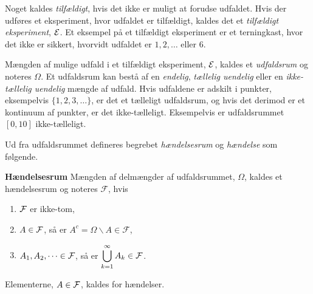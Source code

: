 

%








Noget kaldes \textit{tilfældigt}, hvis det ikke er muligt at forudse udfaldet. Hvis der udføres et eksperiment, hvor udfaldet er tilfældigt, kaldes det et \textit{tilfældigt eksperiment}, $\mathcal{E}$. Et eksempel på et tilfældigt eksperiment er et terningkast, hvor det ikke er sikkert, hvorvidt udfaldet er $1, 2, \dots$ eller $6$. %

Mængden af mulige udfald i et tilfældigt eksperiment, $\mathcal{E}$, kaldes et \textit{udfaldsrum} og noteres $\Omega$. Et udfaldsrum kan bestå af en \textit{endelig}, \textit{tællelig uendelig} eller en \textit{ikke-tællelig uendelig} mængde af udfald. Hvis udfaldene er adskilt i punkter, eksempelvis $\{1,2,3, \dots\}$, er det et tælleligt udfaldsrum, og hvis det derimod er et kontinuum af punkter, er det ikke-tælleligt. Eksempelvis er udfaldsrummet $[0, 10]$ ikke-tælleligt.

Ud fra udfaldsrummet defineres begrebet \textit{hændelsesrum} og \textit{hændelse} som følgende.

\begin{defn}\textbf{Hændelsesrum}
\newline
    Mængden af delmængder af udfaldsrummet, $\Omega$, kaldes et hændelsesrum og noteres $\mathcal{F}$, hvis
    \begin{enumerate}
        \item $\mathcal{F}$ er ikke-tom,
        \item $A\in\mathcal{F}$, så er $A^c=\Omega\backslash A \in \mathcal{F}$,
        \item $A_1, A_2,\dots\in \mathcal{F}$, så er $\displaystyle \bigcup_{k=1}^\infty A_k\in\mathcal{F}$.
    \end{enumerate}
Elementerne, $A\in \mathcal{F}$, kaldes for hændelser.
\end{defn}

